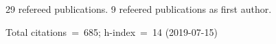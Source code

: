 29 refereed publications. 9 refeered publications as first author.

Total citations~=~685; h-index~=~14 (2019-07-15)